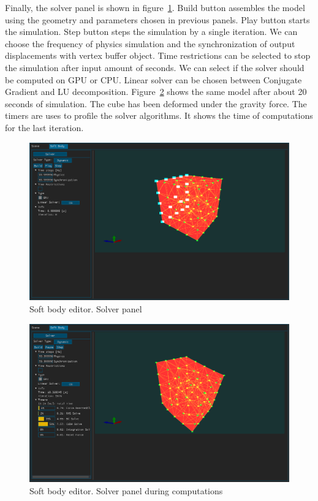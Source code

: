 \documentclass[en]{minipw} %
\begin{document}
Finally, the solver panel is shown in figure~\ref{fig:ifx_solver1}. Build button assembles the model using the geometry and parameters chosen in previous panels. Play button starts the simulation. Step button steps the simulation by a single iteration. We can choose the frequency of physics simulation and the synchronization of output displacements with vertex buffer object. Time restrictions can be selected to stop the simulation after input amount of seconds. We can select if the solver should be computed on GPU or CPU. Linear solver can be chosen between Conjugate Gradient and LU decomposition. Figure~\ref{fig:ifx_solver2} shows the same model after about 20 seconds of simulation. The cube has been deformed under the gravity force. The timers are uses to profile the solver algorithms. It shows the time of computations for the last iteration.

\begin{figure}[h!]
\centering
\includegraphics[scale=0.3]{pictures/ifx/ifx_solver1.png}
\caption[Soft body editor. Solver panel]{Soft body editor. Solver panel}
\label{fig:ifx_solver1}
\end{figure}

\begin{figure}[h!]
\centering
\includegraphics[scale=0.3]{pictures/ifx/ifx_solver2.png}
\caption[Soft body editor. Solver panel during computations]{Soft body editor. Solver panel during computations}
\label{fig:ifx_solver2}
\end{figure}
\end{document}
